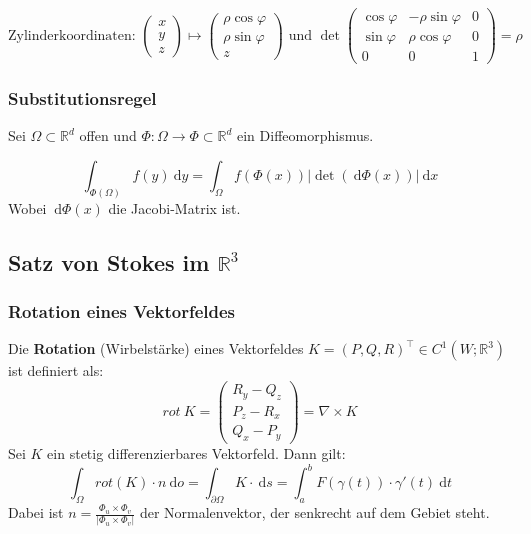 \documentclass[a4paper,10pt]{scrartcl}
\newcommand{\diff}{\ \mathrm{d}}
\begin{document}
\begin{equation}
\text{Zylinderkoordinaten: }
\begin{pmatrix}
x\\y\\z
\end{pmatrix}
\mapsto
\begin{pmatrix}
\rho\cos\varphi\\
\rho\sin\varphi\\
z
\end{pmatrix}
\text{ und }
\det
\begin{pmatrix}
\cos \varphi & -\rho\sin\varphi &0\\
\sin \varphi & \rho\cos\varphi &0\\
0&0&1
\end{pmatrix}
=\rho
\end{equation}
\subsubsection{Substitutionsregel}
Sei $\Omega \subset \mathbb{R}^d$ offen und $\Phi : \Omega \to \Phi \subset \mathbb{R}^d$ ein Diffeomorphismus.

\begin{equation*}
\int_{\Phi(\Omega)} f(y) \diff y = \int_{\Omega} f(\Phi(x))\left|\det\left(\diff {\Phi(x)}\right)\right|\diff x
\end{equation*}
Wobei $\diff {\Phi(x)}$ die Jacobi-Matrix ist.
\subsection{Satz von Stokes im $\mathbb{R}^3$}
\subsubsection{Rotation eines Vektorfeldes}
Die \textbf{Rotation} (Wirbelstärke) eines Vektorfeldes $K=(P,Q,R)^\top \in C^1(W;\mathbb{R}^3)$ ist definiert als:
\begin{equation}
	rot\ K = \begin{pmatrix}
		R_y - Q_z\\
		P_z - R_x\\
		Q_x - P_y
	\end{pmatrix} = 
	\nabla \times K
\end{equation}
Sei $K$ ein stetig differenzierbares Vektorfeld. Dann gilt:
\begin{equation}
	\int_\Omega rot(K) \cdot n \diff o = 
	\int_{\partial \Omega} K\cdot \diff s =
	\int_{a}^{b} F(\gamma(t))\cdot \gamma'(t)\diff t
\end{equation}
Dabei ist $n=\frac{\Phi_u\times \Phi_v}{|\Phi_u \times \Phi_v|}$ der Normalenvektor, der senkrecht auf dem Gebiet steht. 
\end{document}
